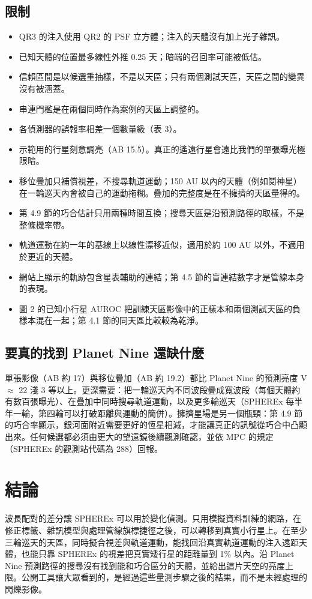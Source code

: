 \documentclass[twocolumn]{aastex631}
\begin{document}
\subsection{限制}
\begin{itemize}
\item QR3 的注入使用 QR2 的 PSF 立方體；注入的天體沒有加上光子雜訊。
\item 已知天體的位置最多線性外推 0.25 天；暗端的召回率可能被低估。
\item 信賴區間是以候選重抽樣，不是以天區；只有兩個測試天區，天區之間的變異沒有被涵蓋。
\item 串連門檻是在兩個同時作為案例的天區上調整的。
\item 各偵測器的誤報率相差一個數量級（表 3）。
\item 示範用的行星刻意調亮（AB 15.5）。真正的遙遠行星會遠比我們的單張曝光極限暗。
\item 移位疊加只補償視差，不搜尋軌道運動；150 AU 以內的天體（例如鬩神星）在一輪巡天內會被自己的運動拖糊。疊加的完整度是在不擁擠的天區量得的。
\item 第 4.9 節的巧合估計只用兩種時間互換；搜尋天區是沿預測路徑的取樣，不是整條機率帶。
\item 軌道運動在約一年的基線上以線性漂移近似，適用於約 100 AU 以外，不適用於更近的天體。
\item 網站上顯示的軌跡包含星表輔助的連結；第 4.5 節的盲連結數字才是管線本身的表現。
\item 圖 2 的已知小行星 AUROC 把訓練天區影像中的正樣本和兩個測試天區的負樣本混在一起；第 4.1 節的同天區比較較為乾淨。
\end{itemize}

\subsection{要真的找到 Planet Nine 還缺什麼}
單張影像（AB 約 17）與移位疊加（AB 約 19.2）都比 Planet Nine 的預測亮度 V $\approx$ 22 淺 3 等以上。更深需要：把一輪巡天內不同波段疊成寬波段（每個天體約有數百張曝光）、在疊加中同時搜尋軌道運動，以及更多輪巡天（SPHEREx 每半年一輪，第四輪可以打破距離與運動的簡併）。擁擠星場是另一個瓶頸：第 4.9 節的巧合率顯示，銀河面附近需要更好的恆星相減，才能讓真正的訊號從巧合中凸顯出來。任何候選都必須由更大的望遠鏡後續觀測確認，並依 MPC 的規定（SPHEREx 的觀測站代碼為 288）回報。

\section{結論}
\label{sec:conclusions}
波長配對的差分讓 SPHEREx 可以用於變化偵測。只用模擬資料訓練的網路，在修正標籤、雜訊模型與處理管線旗標捷徑之後，可以轉移到真實小行星上。在至少三輪巡天的天區，同時擬合視差與軌道運動，能找回沿真實軌道運動的注入遠距天體，也能只靠 SPHEREx 的視差把真實矮行星的距離量到 1\% 以內。沿 Planet Nine 預測路徑的搜尋沒有找到能和巧合區分的天體，並給出這片天空的亮度上限。公開工具讓大眾看到的，是經過這些量測步驟之後的結果，而不是未經處理的閃爍影像。
\end{document}
